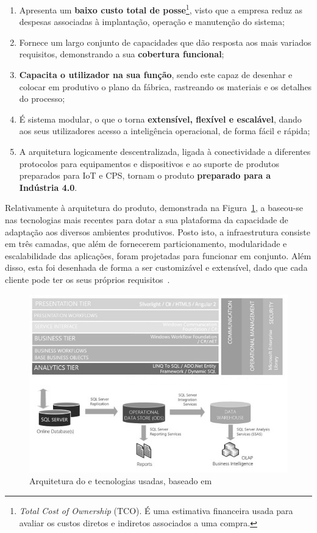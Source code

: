 \begin{enumerate}
    \item 
    {
        Apresenta um \textbf{baixo custo total de posse}\footnote{\textit{Total Cost of Ownership} (TCO). É uma estimativa financeira usada para avaliar os custos diretos e indiretos associados a uma compra.}, visto que a empresa reduz as despesas associadas à implantação, operação e manutenção do sistema;
    }
    \item
    {
        Fornece um largo conjunto de capacidades que dão resposta aos mais variados requisitos, demonstrando a sua \textbf{cobertura funcional};
    }
    \item
    {
        \textbf{Capacita o utilizador na sua função}, sendo este capaz de desenhar e colocar em produtivo o plano da fábrica, rastreando os materiais e os detalhes do processo;
    }
    \item
    {
        É sistema modular, o que o torna \textbf{extensível, flexível e escalável}, dando aos seus utilizadores acesso a inteligência operacional, de forma fácil e rápida; 
    }
    \item
    {
        A arquitetura logicamente descentralizada, ligada à conectividade a diferentes protocolos para equipamentos e dispositivos e ao suporte de produtos preparados para \gls{IoT} e \gls{CPS}, tornam o produto \textbf{preparado para a Indústria 4.0}.
    }
\end{enumerate}

Relativamente à arquitetura do produto, demonstrada na Figura~\ref{fig:mes_framework}, a {\companyname} baseou-se nas tecnologias mais
recentes para dotar a sua plataforma da capacidade de adaptação aos diversos ambientes produtivos. Posto isto, a infraestrutura consiste em três camadas, que além de fornecerem particionamento, modularidade e escalabilidade das aplicações, foram projetadas para funcionar em conjunto. Além disso, esta foi desenhada de forma a ser customizável e extensível, dado que cada cliente pode ter os seus próprios requisitos~\parencite{cmf_mes_framework}.

\begin{figure}[!ht]
    \centering
    \includegraphics[width=.9\textwidth]{ch2/assets/mes_framework.jpg}
    \caption{Arquitetura do {\productname} e tecnologias usadas, baseado em~\textcite{cmf_mes_framework}}
    \label{fig:mes_framework}
\end{figure}

